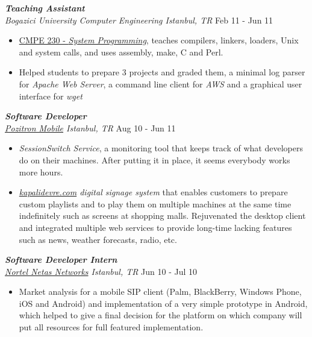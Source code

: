 \documentclass[line, margin]{res}
\begin{document}
\begin{resume}
{\sl \textbf{Teaching Assistant} \\ Bogazici University Computer Engineering Istanbul, TR} \hfill Feb 11 - Jun 11 \\
\vspace{-.3cm}
\begin{itemize} \itemsep -2pt
  \item \href{http://www.cmpe.boun.edu.tr/courses/?cmpe=230}{CMPE 230 - \textit{System Programming}}, teaches compilers, linkers, loaders, Unix and system calls, and uses assembly, make, C and Perl.
  \item Helped students to prepare 3 projects and graded them, a minimal log parser for \textit{Apache Web Server}, a command line client for \textit{AWS} and a graphical user interface for \textit{wget}
\end{itemize}

{\sl \textbf{Software Developer} \\ \href{http://www.pozitron.com/}{Pozitron Mobile} Istanbul, TR} \hfill Aug 10 - Jun 11 \\
\vspace{-0.3cm}
\begin{itemize} \itemsep -2pt
  \item \textit{SessionSwitch Service}, a monitoring tool that keeps track of what developers do on their machines. After putting it in place, it seems everybody works more hours.
  \item \textit{\href{http://kapalidevre.com}{kapalidevre.com} digital signage system} that enables customers to prepare custom playlists and to play them on multiple machines at the same time indefinitely such as screens at shopping malls. Rejuvenated the desktop client and integrated multiple web services to provide long-time lacking features such as news, weather forecasts, radio, etc.
\end{itemize}

{\sl \textbf{Software Developer Intern} \\ \href{http://netas.com.tr/en}{Nortel Netas Networks} Istanbul, TR} \hfill Jun 10 - Jul 10 \\
\vspace{-0.3cm}
\begin{itemize} \itemsep -2pt
  \item Market analysis for a mobile SIP client (Palm, BlackBerry, Windows Phone, iOS and Android) and implementation of a very simple prototype in Android, which helped to give a final decision for the platform on which company will put all resources for full featured implementation.
\end{itemize}


\end{resume}
\end{document}
